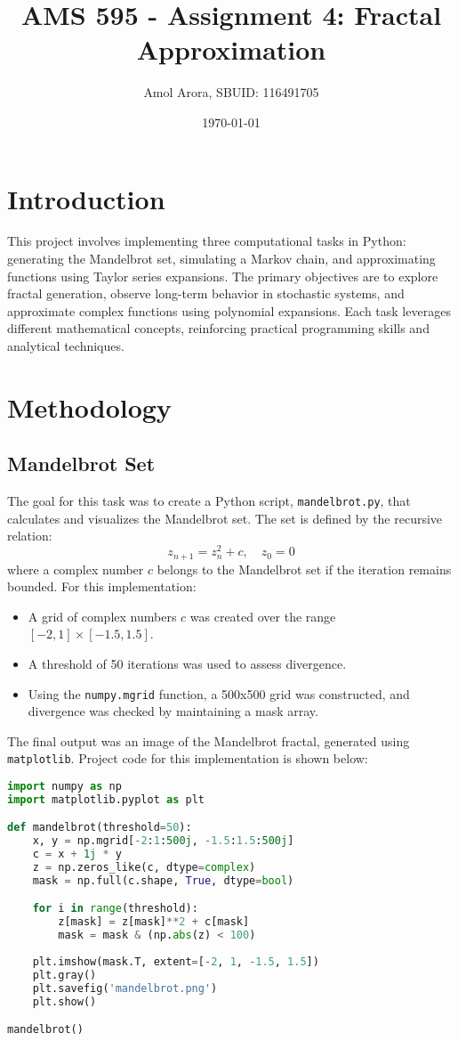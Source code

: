 \documentclass{article}
\title{AMS 595 - Assignment 4: Fractal Approximation}
\author{Amol Arora, SBUID: 116491705}
\date{\today}
\begin{document}
\maketitle

\section{Introduction}
This project involves implementing three computational tasks in Python: generating the Mandelbrot set, simulating a Markov chain, and approximating functions using Taylor series expansions. The primary objectives are to explore fractal generation, observe long-term behavior in stochastic systems, and approximate complex functions using polynomial expansions. Each task leverages different mathematical concepts, reinforcing practical programming skills and analytical techniques.

\section{Methodology}

\subsection{Mandelbrot Set}
The goal for this task was to create a Python script, \texttt{mandelbrot.py}, that calculates and visualizes the Mandelbrot set. The set is defined by the recursive relation:
\[
z_{n+1} = z_n^2 + c, \quad z_0 = 0
\]
where a complex number \(c\) belongs to the Mandelbrot set if the iteration remains bounded. For this implementation:
\begin{itemize}
    \item A grid of complex numbers \(c\) was created over the range \([-2, 1] \times [-1.5, 1.5]\).
    \item A threshold of 50 iterations was used to assess divergence.
    \item Using the \texttt{numpy.mgrid} function, a 500x500 grid was constructed, and divergence was checked by maintaining a mask array.
\end{itemize}
The final output was an image of the Mandelbrot fractal, generated using \texttt{matplotlib}. Project code for this implementation is shown below:
\begin{lstlisting}[language=Python]
import numpy as np
import matplotlib.pyplot as plt

def mandelbrot(threshold=50):
    x, y = np.mgrid[-2:1:500j, -1.5:1.5:500j]
    c = x + 1j * y
    z = np.zeros_like(c, dtype=complex)
    mask = np.full(c.shape, True, dtype=bool)

    for i in range(threshold):
        z[mask] = z[mask]**2 + c[mask]
        mask = mask & (np.abs(z) < 100)
    
    plt.imshow(mask.T, extent=[-2, 1, -1.5, 1.5])
    plt.gray()
    plt.savefig('mandelbrot.png')
    plt.show()

mandelbrot()
\end{lstlisting}
\end{document}

